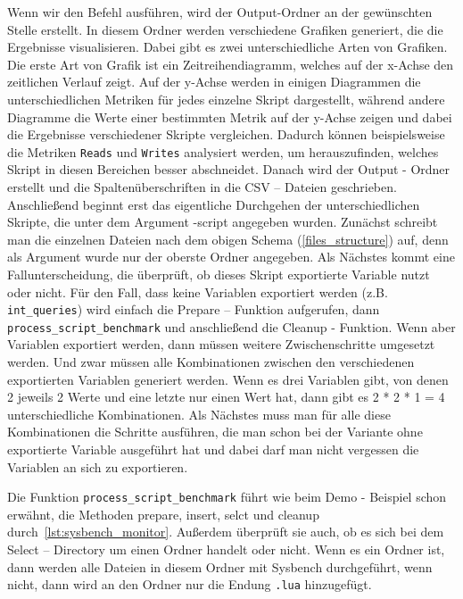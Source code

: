 Wenn wir den Befehl ausführen, wird der Output-Ordner an der gewünschten Stelle erstellt.
In diesem Ordner werden verschiedene Grafiken generiert, die die Ergebnisse visualisieren.
Dabei gibt es zwei unterschiedliche Arten von Grafiken.
Die erste Art von Grafik ist ein Zeitreihendiagramm, welches auf der x-Achse den zeitlichen Verlauf zeigt.
Auf der y-Achse werden in einigen Diagrammen die unterschiedlichen Metriken für jedes einzelne Skript dargestellt, während andere Diagramme die Werte einer bestimmten Metrik auf der y-Achse zeigen und dabei die Ergebnisse verschiedener Skripte vergleichen.
Dadurch können beispielsweise die Metriken \texttt{Reads} und \texttt{Writes} analysiert werden, um herauszufinden, welches Skript in diesen Bereichen besser abschneidet.
Danach wird der Output - Ordner erstellt und die Spaltenüberschriften in die CSV – Dateien geschrieben.
Anschließend beginnt erst das eigentliche Durchgehen der unterschiedlichen Skripte, die unter dem Argument -script angegeben wurden.
Zunächst schreibt man die einzelnen Dateien nach dem obigen Schema (\ref{files_structure}) auf, denn als Argument wurde nur der oberste Ordner angegeben.
Als Nächstes kommt eine Fallunterscheidung, die überprüft, ob dieses Skript exportierte Variable nutzt oder nicht.
Für den Fall, dass keine Variablen exportiert werden (z.B. \texttt{int\_queries}) wird einfach die Prepare – Funktion aufgerufen, dann \texttt{process\_script\_benchmark} und anschließend die Cleanup - Funktion.
Wenn aber Variablen exportiert werden, dann müssen weitere Zwischenschritte umgesetzt werden.
Und zwar müssen alle Kombinationen zwischen den verschiedenen exportierten Variablen generiert werden.
Wenn es drei Variablen gibt, von denen 2 jeweils 2 Werte und eine letzte nur einen Wert hat, dann gibt es 2 * 2 * 1 = 4 unterschiedliche Kombinationen.
Als Nächstes muss man für alle diese Kombinationen die Schritte ausführen, die man schon bei der Variante ohne exportierte Variable ausgeführt hat und dabei darf man nicht vergessen die Variablen an sich zu exportieren.



Die Funktion \texttt{process\_script\_benchmark} führt wie beim Demo - Beispiel schon erwähnt, die Methoden prepare, insert, selct und cleanup durch~\ref{lst:sysbench_monitor}.
Außerdem überprüft sie auch, ob es sich bei dem Select – Directory um einen Ordner handelt oder nicht.
Wenn es ein Ordner ist, dann werden alle Dateien in diesem Ordner mit Sysbench durchgeführt, wenn nicht, dann wird an den Ordner nur die Endung \texttt{.lua} hinzugefügt.

